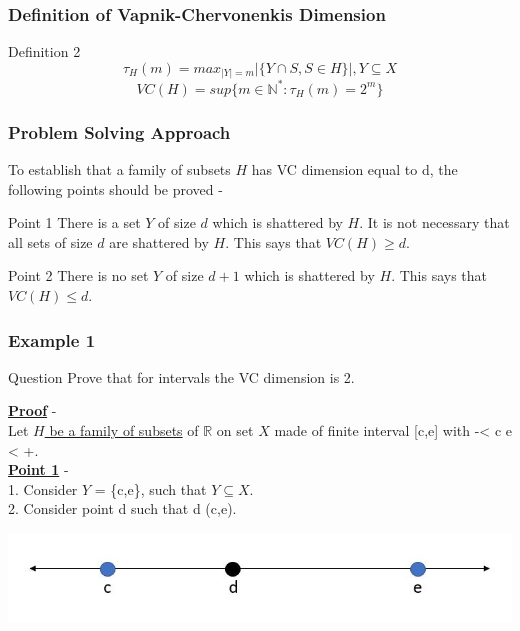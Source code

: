 \documentclass{beamer}
\begin{document}
\begin{frame}
\frametitle{Definition of Vapnik-Chervonenkis Dimension}
\begin{alertblock}{Definition 2}
\[\tau_H(m) = max_{|Y|=m}|\{Y \cap S, S \in H\}|, Y \subseteq X\]
\[VC(H) = sup\{m\in \mathbb{N^*}:\tau_H(m)=2^m\}\]
\end{alertblock}

\end{frame}

\begin{frame}
\frametitle{Problem Solving Approach}
\item To establish that a family of subsets $H$ has VC dimension equal to d, the following points should be proved -
\begin{block}{Point 1}
There is a set $Y$ of size $d$ which is shattered by $H$. It is not necessary that all sets of size $d$ are shattered by $H$. This says that $VC(H) \geq d$.
\end{block}
\begin{block}{Point 2}
There is no set $Y$ of size $d+1$ which is shattered by $H$. This says that $VC(H) \leq d$.
\end{block}
\end{frame}

\begin{frame}
\frametitle{Example 1}
\begin{block}{Question}
Prove that for intervals the VC dimension is 2.
\end{block}
\textbf{\underline{Proof}} -\\
Let \underline{$H$ be a family of subsets} of $\mathbb{R}$ on set $X$ made of finite interval [c,e] with -\infty < c \leq e < +\infty.\\
\textbf{\underline{Point 1}} -\\
1. Consider $Y$ = \{c,e\}, such that $Y \subseteq X$.\\
2. Consider point d such that d \in (c,e).
\begin{center}
    \includegraphics[scale = 0.5]{figures/Capture1.JPG}
\end{center}
\end{frame}
\end{document}
